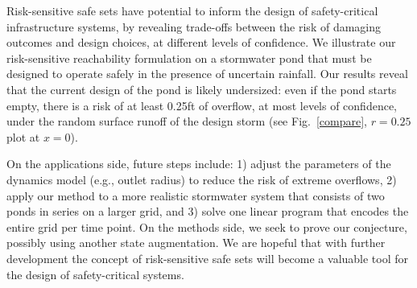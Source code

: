 \documentclass[letterpaper, 10 pt, conference]{ieeeconf}  %
\begin{document}
Risk-sensitive safe sets have potential to inform the design of safety-critical infrastructure systems,
by revealing trade-offs between the risk of damaging outcomes and design choices, at different levels of confidence.
We illustrate our risk-sensitive reachability formulation on a stormwater pond that must be designed to operate safely in the presence of uncertain rainfall. 
Our results reveal that the current design of the pond is likely undersized: even if the pond starts empty, 
there is a risk of at least 0.25ft of overflow, at most levels of confidence, 
under the random surface runoff of the design storm (see Fig.~\ref{compare}, $r=0.25$ plot at $x=0$).

On the applications side, future steps include: 1) adjust the parameters of the dynamics model (e.g., outlet radius) to reduce the risk of extreme overflows, 
2) apply our method to a more realistic stormwater system that consists of two ponds in series on a larger grid,
and 3) solve one linear program that encodes the entire grid per time point.
On the methods side, we seek to prove our conjecture, possibly using another state augmentation.
We are hopeful that with further development the concept of risk-sensitive safe sets will become a valuable tool for the design of safety-critical systems.
%  
%
\end{document}
